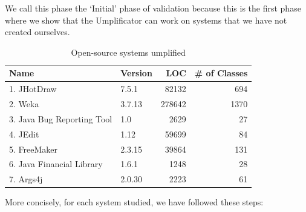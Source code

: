 We call this phase the `Initial' phase of validation because this is the first phase where we show that the Umplificator can work on systems that we have not created ourselves.

\begin{table}
\caption{Open-source systems umplified}
\label{table:umplifiedSystems}
\centering
\begin{tabular}{l|lrr}
\toprule
\rowcolor[HTML]{BBDAFF}
\textbf{Name} & \textbf{Version} & \textbf{LOC} & \textbf{\# of Classes} \\ \midrule
 1. JHotDraw \cite{jhotdraw}                   & 7.5.1   & 82132   & 694      \\ 
\hline 2.  Weka \cite{wekasvn}      & 3.7.13  & 278642  & 1370        \\ 
\hline  3. Java Bug Reporting Tool\cite{jbrtsvn} 		& 1.0     & 2629    & 27        \\ 
\hline  4. JEdit\cite{jeditsvn}                   	& 1.12    & 59699   & 84         \\ 
\hline  5. FreeMaker\cite{freemakersvn}               & 2.3.15  & 39864   & 131         \\ 
\hline  6. Java Financial Library\cite{jflsvn}  		& 1.6.1   & 1248    & 28          \\ 
\hline  7. Args4j\cite{args4jsvn}                 	 & 2.0.30  & 2223    & 61            \\
\bottomrule
\end{tabular}
\end{table}

More concisely, for each system studied, we have followed these steps:

